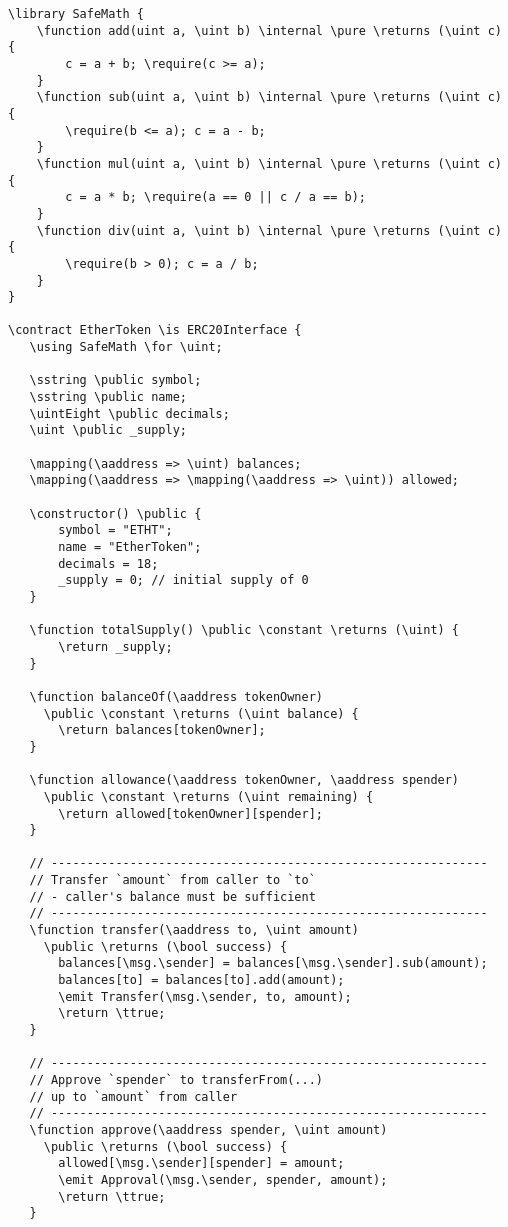 \documentclass{llncs}
\newcommand{\red}[1]{\textcolor[rgb]{1,0,0}{#1}}
\newcommand{\blue}[1]{\textcolor[rgb]{0,0,1}{#1}}
\newcommand{\brown}[1]{\textcolor[rgb]{0.8,0.6,0.4}{#1}}
\newcommand{\green}[1]{\textcolor[rgb]{0.1,0.7,0.1}{#1}}
\newcommand{\verbsize}{\small}
\newcommand{\contract}{\red{contract}}
\newcommand{\library}{\red{library}}
\newcommand{\function}{\blue{function}}
\newcommand{\returns}{\blue{returns}}
\newcommand{\public}{\blue{public}}
\newcommand{\constant}{\blue{constant}}
\newcommand{\internal}{\blue{internal}}
\newcommand{\pure}{\blue{pure}}
\newcommand{\require}{\blue{require}}
\newcommand{\return}{\blue{return}}
\newcommand{\constructor}{\blue{consructor}}
\newcommand{\is}{\blue{is}}
\newcommand{\using}{\blue{using}}
\newcommand{\for}{\blue{for}}
\newcommand{\emit}{\blue{emit}}
\newcommand{\ttrue}{\green{true}}
\newcommand{\msg}{\green{msg}}
\newcommand{\sender}{\green{sender}}
\newcommand{\sstring}{\brown{string}}
\newcommand{\uintEight}{\brown{uint8}}
\newcommand{\uint}{\brown{uint}}
\newcommand{\bool}{\brown{bool}}
\newcommand{\aaddress}{\brown{address}}
\newcommand{\mapping}{\brown{mapping}}
\begin{document}
\begin{small}
\begin{Verbatim}[commandchars=\\\?\?,fontsize=\verbsize]
\library SafeMath {
    \function add(uint a, \uint b) \internal \pure \returns (\uint c) {
        c = a + b; \require(c >= a);
    }
    \function sub(uint a, \uint b) \internal \pure \returns (\uint c) {
        \require(b <= a); c = a - b;
    }
    \function mul(uint a, \uint b) \internal \pure \returns (\uint c) {
        c = a * b; \require(a == 0 || c / a == b);
    }
    \function div(uint a, \uint b) \internal \pure \returns (\uint c) {
        \require(b > 0); c = a / b;
    }
}

\contract EtherToken \is ERC20Interface {
   \using SafeMath \for \uint;

   \sstring \public symbol;
   \sstring \public name;
   \uintEight \public decimals;
   \uint \public _supply;

   \mapping(\aaddress => \uint) balances;
   \mapping(\aaddress => \mapping(\aaddress => \uint)) allowed;

   \constructor() \public {
       symbol = "ETHT";
       name = "EtherToken";
       decimals = 18;
       _supply = 0; // initial supply of 0
   }

   \function totalSupply() \public \constant \returns (\uint) {
       \return _supply;
   }

   \function balanceOf(\aaddress tokenOwner)
     \public \constant \returns (\uint balance) {
       \return balances[tokenOwner];
   }

   \function allowance(\aaddress tokenOwner, \aaddress spender)
     \public \constant \returns (\uint remaining) {
       \return allowed[tokenOwner][spender];
   }

   // -------------------------------------------------------------
   // Transfer `amount` from caller to `to`
   // - caller's balance must be sufficient
   // -------------------------------------------------------------
   \function transfer(\aaddress to, \uint amount)
     \public \returns (\bool success) {
       balances[\msg.\sender] = balances[\msg.\sender].sub(amount);
       balances[to] = balances[to].add(amount);
       \emit Transfer(\msg.\sender, to, amount);
       \return \ttrue;
   }

   // -------------------------------------------------------------
   // Approve `spender` to transferFrom(...)
   // up to `amount` from caller
   // -------------------------------------------------------------
   \function approve(\aaddress spender, \uint amount)
     \public \returns (\bool success) {
       allowed[\msg.\sender][spender] = amount;
       \emit Approval(\msg.\sender, spender, amount);
       \return \ttrue;
   }


\end{Verbatim}
\end{small}
\end{document}
